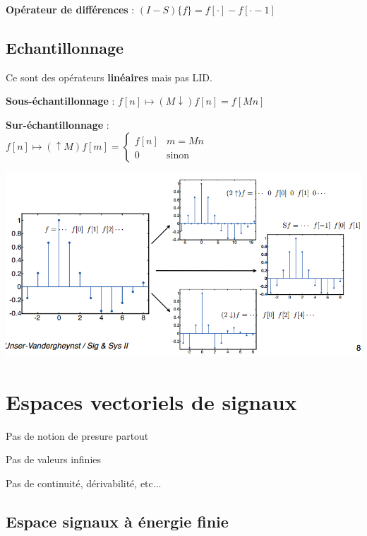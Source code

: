 \textbf{Opérateur de différences} : $(I-S)\{f\}=f[\cdot]-f[\cdot-1]$

\subsection*{Echantillonnage}

Ce sont des opérateurs \textbf{linéaires} mais pas LID.

\textbf{Sous-échantillonnage} : $f[n] \mapsto (M\downarrow)f[n] = f[Mn]$

\textbf{Sur-échantillonnage} : \\
$f[n]\mapsto (\uparrow M)f[m] = \begin{cases} f[n] & m=Mn \\0 & \text{sinon} \end{cases}$

\begin{Figure}
 \centering
 \includegraphics[width=\linewidth]{res/operateurs-echant.png}
\end{Figure}


\section{Espaces vectoriels de signaux}

\begin{myitemize}
    \item Pas de notion de presure partout
    \item Pas de valeurs infinies
    \item Pas de continuité, dérivabilité, etc...
\end{myitemize}

\subsection*{Espace signaux à énergie finie}

